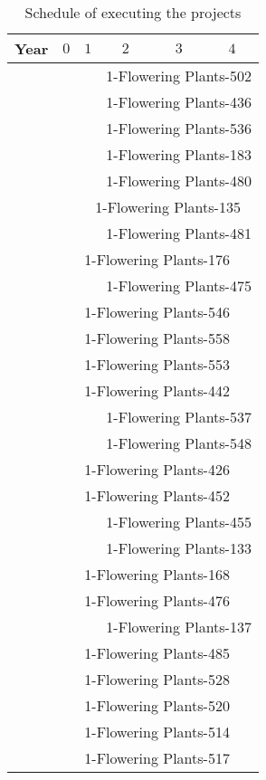 \documentclass{article}
\begin{document}
\begin{table}
\centering
\caption{Schedule of executing the projects}
\label{tab:schedule}
\begin{tabular}{c||c|c|c|c|c}
Year & $0$ & $1$ & $2$ & $3$ & $4$\\
\hline
& & & \multicolumn{3}{c}{1-Flowering Plants-502}\\
& & & \multicolumn{3}{c}{1-Flowering Plants-436}\\
& & & \multicolumn{3}{c}{1-Flowering Plants-536}\\
& & & \multicolumn{3}{c}{1-Flowering Plants-183}\\
& & & \multicolumn{3}{c}{1-Flowering Plants-480}\\
& & \multicolumn{4}{c}{1-Flowering Plants-135}\\
& & & \multicolumn{3}{c}{1-Flowering Plants-481}\\
& \multicolumn{5}{c}{1-Flowering Plants-176}\\
& & & \multicolumn{3}{c}{1-Flowering Plants-475}\\
& \multicolumn{5}{c}{1-Flowering Plants-546}\\
& \multicolumn{5}{c}{1-Flowering Plants-558}\\
& \multicolumn{5}{c}{1-Flowering Plants-553}\\
& \multicolumn{5}{c}{1-Flowering Plants-442}\\
& & & \multicolumn{3}{c}{1-Flowering Plants-537}\\
& & & \multicolumn{3}{c}{1-Flowering Plants-548}\\
& \multicolumn{5}{c}{1-Flowering Plants-426}\\
& \multicolumn{5}{c}{1-Flowering Plants-452}\\
& & & \multicolumn{3}{c}{1-Flowering Plants-455}\\
& & & \multicolumn{3}{c}{1-Flowering Plants-133}\\
& \multicolumn{5}{c}{1-Flowering Plants-168}\\
& \multicolumn{5}{c}{1-Flowering Plants-476}\\
& & & \multicolumn{3}{c}{1-Flowering Plants-137}\\
& \multicolumn{5}{c}{1-Flowering Plants-485}\\
& \multicolumn{5}{c}{1-Flowering Plants-528}\\
& \multicolumn{5}{c}{1-Flowering Plants-520}\\
& \multicolumn{5}{c}{1-Flowering Plants-514}\\
& \multicolumn{5}{c}{1-Flowering Plants-517}\\

\end{tabular}
\end{table}
\end{document}

